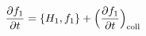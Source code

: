 \documentclass[preview]{standalone}
\begin{document}
\begin{align*}
\special{dvisvgm:raw <g id='unique000'>}\pdv{f_1}{t}=\pb{H_1}{f_1}+\Big(\pdv{f_1}{t}\Big)_{\rm coll}\special{dvisvgm:raw </g>}
\end{align*}
\end{document}
